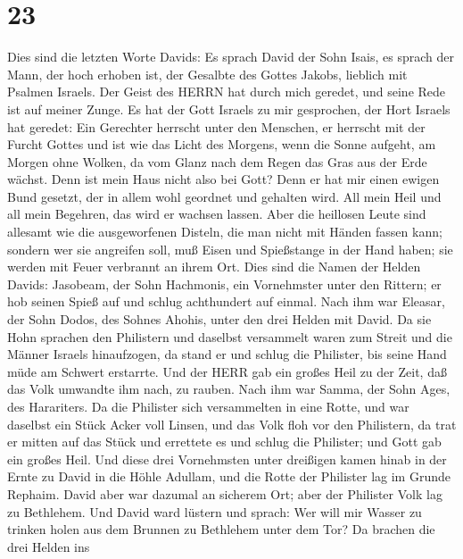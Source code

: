 \hypertarget{section-22}{%
\section{23}\label{section-22}}

 Dies sind die letzten Worte Davids: Es sprach David der
Sohn Isais, es sprach der Mann, der hoch erhoben ist, der Gesalbte des
Gottes Jakobs, lieblich mit Psalmen Israels.  Der Geist des
HERRN hat durch mich geredet, und seine Rede ist auf meiner Zunge.
 Es hat der Gott Israels zu mir gesprochen, der Hort Israels
hat geredet: Ein Gerechter herrscht unter den Menschen, er herrscht mit
der Furcht Gottes  und ist wie das Licht des Morgens, wenn
die Sonne aufgeht, am Morgen ohne Wolken, da vom Glanz nach dem Regen
das Gras aus der Erde wächst.  Denn ist mein Haus nicht also
bei Gott? Denn er hat mir einen ewigen Bund gesetzt, der in allem wohl
geordnet und gehalten wird. All mein Heil und all mein Begehren, das
wird er wachsen lassen.  Aber die heillosen Leute sind
allesamt wie die ausgeworfenen Disteln, die man nicht mit Händen fassen
kann;  sondern wer sie angreifen soll, muß Eisen und
Spießstange in der Hand haben; sie werden mit Feuer verbrannt an ihrem
Ort.  Dies sind die Namen der Helden Davids: Jasobeam, der
Sohn Hachmonis, ein Vornehmster unter den Rittern; er hob seinen Spieß
auf und schlug achthundert auf einmal.  Nach ihm war
Eleasar, der Sohn Dodos, des Sohnes Ahohis, unter den drei Helden mit
David. Da sie Hohn sprachen den Philistern und daselbst versammelt waren
zum Streit und die Männer Israels hinaufzogen,  da stand er
und schlug die Philister, bis seine Hand müde am Schwert erstarrte. Und
der HERR gab ein großes Heil zu der Zeit, daß das Volk umwandte ihm
nach, zu rauben.  Nach ihm war Samma, der Sohn Ages, des
Harariters. Da die Philister sich versammelten in eine Rotte, und war
daselbst ein Stück Acker voll Linsen, und das Volk floh vor den
Philistern,  da trat er mitten auf das Stück und errettete
es und schlug die Philister; und Gott gab ein großes Heil. 
Und diese drei Vornehmsten unter dreißigen kamen hinab in der Ernte zu
David in die Höhle Adullam, und die Rotte der Philister lag im Grunde
Rephaim.  David aber war dazumal an sicherem Ort; aber der
Philister Volk lag zu Bethlehem.  Und David ward lüstern
und sprach: Wer will mir Wasser zu trinken holen aus dem Brunnen zu
Bethlehem unter dem Tor?  Da brachen die drei Helden ins
